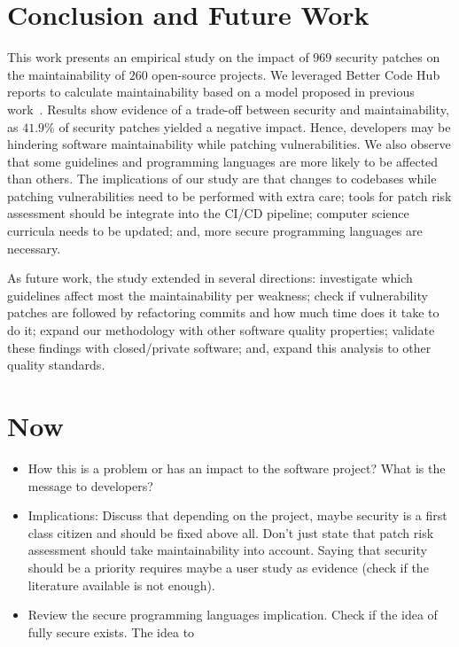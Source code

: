 \documentclass[smallextended]{svjour3}       %
\begin{document}
\section{Conclusion and Future Work}\label{sec:conclusions}

This work presents an empirical study on the impact of $969$ security
patches on the maintainability of $260$ open-source projects. We leveraged
Better Code Hub reports to calculate maintainability based on a model proposed in 
previous work~\cite{Olivari:2018,8919169}. Results show evidence of a 
trade-off between security and maintainability, as $41.9\%$ of security patches 
yielded a negative impact. Hence,
developers may be hindering software maintainability while patching 
vulnerabilities. We also observe that some guidelines 
and programming languages are more likely to be affected than others. The implications 
of our study are that changes to codebases while patching 
vulnerabilities need to be performed with extra care; tools
for patch risk assessment should be integrate into the CI/CD pipeline; computer science
curricula needs to be updated; and, more secure programming languages are necessary.

As future work, the study extended in several directions: 
investigate which guidelines affect most the maintainability per
weakness; check if vulnerability patches are followed by refactoring
commits and how much time does it take to do it; 
expand our methodology with other software quality properties; 
validate these findings with closed/private
software; and, expand this analysis to other quality standards.

\section{Now}

\begin{itemize}
	\item How this is a problem or has an impact to the software project? What is the message to developers? 
	\item Implications: Discuss that depending on the project, maybe security is a first class citizen and should be fixed above all. Don't 
  just state that patch risk assessment should take maintainability into account. Saying that security should be a priority requires maybe a user study
  as evidence (check if the literature available is not enough).
  \item Review the secure programming languages implication. Check if the idea of fully secure exists. The idea to 
\end{itemize}
\end{document}
